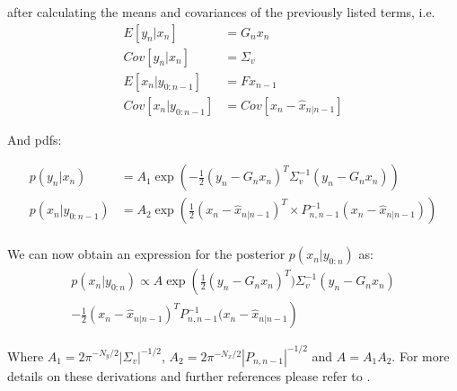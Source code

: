 \documentclass[a4paper,10pt]{article}
\begin{document}
after calculating the means and covariances of the previously listed terms, i.e.
\begin{equation}
\begin{aligned}
 E[y_n|x_n]        &= G_n x_n\\
 Cov[y_n|x_n]       &= \Sigma_v\\
 E[x_n|y_{0:n-1}]   &= Fx_{n-1}\\
 Cov[x_n|y_{0:n-1}] &= Cov[x_n - \hat{x}_{n|n-1}]
\end{aligned}
\end{equation}


And pdfs:

\begin{align}
 p(y_n|x_n)       &= A_1 \exp(-\frac{1}{2}(y_n - G_n x_n)^T \Sigma^{-1}_v (y_n - G_n x_n)) \\
 p(x_n|y_{0:n-1}) &= A_2 \exp(\frac{1}{2}(x_n - \hat{x}_{n|n-1})^T \times P^{-1}_{n,n-1}(x_n - \hat{x}_{n|n-1}))\\
\end{align}

We can now obtain an expression for the posterior $p(x_n|y_{0:n})$ as:
\begin{multline}
 p(x_n|y_{0:n}) \propto A \exp\left(\frac{1}{2} (y_n - G_n x_n)^T)\Sigma^{-1}_v (y_n - G_n x_n) \right.\\
		\left.- \frac{1}{2}(x_n - \hat{x}_{n|n-1})^T P^{-1}_{n,n-1}(x_n - \hat{x}_{n|n-1}\right)
\end{multline}

Where $A_1 = 2\pi^{-N_y/2}|\Sigma_v|^{-1/2}$, $A_2 = 2\pi^{-N_x/2}|P_{n,n-1}|^{-1/2}$ and $A=A_1 A_2$. 
For more details on these derivations and further references please refer to \cite{Chen2003}.


 

\end{document}
